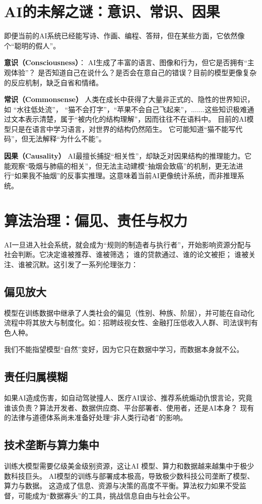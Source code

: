 \section{AI的未解之谜：意识、常识、因果}

即便当前的AI系统已经能写诗、作画、编程、答辩，但在某些方面，它依然像个“聪明的假人”。

\textbf{意识（Consciousness）}：
AI生成了丰富的语言、图像和行为，但它是否拥有“主观体验”？  
是否知道自己在说什么？是否会在意自己的错误？目前的模型更像复杂的反应机制，缺乏自省和情绪。  

\textbf{常识（Commonsense）}
人类在成长中获得了大量非正式的、隐性的世界知识，如 “水往低处流”， “猫不会打字”，“苹果不会自己飞起来”，.......这些知识极难通过文本表示清楚，属于“被内化的结构理解”，因而往往不在语料中。
目前的AI模型只是在语言中学习语言，对世界的结构仍然陌生。 它可能知道“猫不能写代码”，但无法解释“为什么不能”。

\textbf{因果（Causality）}
AI最擅长捕捉“相关性”，却缺乏对因果结构的推理能力。它能观察“吸烟与肺癌的相关”，但无法主动建模“抽烟会致癌”的机制，更无法进行“如果我不抽烟”的反事实推理。这意味着当前AI更像统计系统，而非推理系统。

\section{算法治理：偏见、责任与权力}

AI一旦进入社会系统，就会成为“规则的制造者与执行者”，开始影响资源分配与社会判断。它决定谁被推荐、谁被筛选； 谁的贷款通过、谁的论文被拒； 谁被关注、谁被沉默。这引发了一系列伦理张力：

\subsection*{偏见放大}
模型在训练数据中继承了人类社会的偏见（性别、种族、阶层），并可能在自动化流程中将其放大与制度化。如：招聘歧视女性、金融打压低收入人群、司法误判有色人种。

我们不能指望模型“自然”变好，因为它只在数据中学习，而数据本身就不公。

\subsection*{责任归属模糊}
如果AI造成伤害，如自动驾驶撞人、医疗AI误诊、推荐系统煽动仇恨言论，究竟谁该负责？算法开发者、数据供应商、平台部署者、使用者，还是AI本身？
现有的法律与道德体系尚未准备好处理“非人类行动者”的影响。

\subsection*{技术垄断与算力集中}
训练大模型需要亿级美金级别资源，这让AI 模型、算力和数据越来越集中于极少数科技巨头。
AI模型的训练与部署成本极高，导致极少数科技公司垄断了模型、算力与数据。
这造成了信息、资源与决策的高度不平衡。算法权力如果不受监督，可能成为“数据寡头”的工具，挑战信息自由与社会公平。

